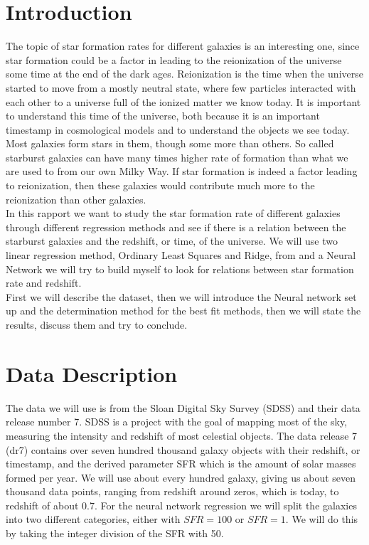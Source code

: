\documentclass[11pt, A4paper, english]{article}
\begin{document}
	
	\begin{multicols}{2}
		\section{Introduction}
The topic of star formation rates for different galaxies is an interesting one, since star formation could be a factor in leading to the reionization of the universe some time at the end of the dark ages. Reionization is the time when the universe started to move from a mostly neutral state, where few particles interacted with each other to a universe full of the ionized matter we know today. It is important to understand this time of the universe, both because it is an important timestamp in cosmological models and to understand the objects we see today. \\
Most galaxies form stars in them, though some more than others. So called starburst galaxies can have many times higher rate of formation than what we are used to from our own Milky Way. If star formation is indeed a factor leading to reionization, then these galaxies would contribute much more to the reionization than other galaxies. \\
In this rapport we want to study the star formation rate of different galaxies through different regression methods and see if there is a relation between the starburst galaxies and the redshift, or time, of the universe. We will use two linear regression method, Ordinary Least Squares and Ridge, from \cite{Project 1} and a Neural Network we will try to build myself to look for relations between star formation rate and redshift. \\
First we will describe the dataset, then we will introduce the Neural network set up and the determination method for the best fit methods, then we will state the results, discuss them and try to conclude.
		
		\section{Data Description}
The data we will use is from the Sloan Digital Sky Survey (SDSS) \cite{SDSS} and their data release number 7. SDSS is a project with the goal of mapping most of the sky, measuring the intensity and redshift of most celestial objects. The data release 7 (dr7) contains over seven hundred thousand galaxy objects with their redshift, or timestamp, and the derived parameter SFR which is the amount of solar masses formed per year. We will use about every hundred galaxy, giving us about seven thousand data points, ranging from redshift around zeros, which is today, to redshift of about 0.7. For the neural network regression we will split the galaxies into two different categories, either with $SFR = 100$ or $SFR = 1$. We will do this by taking the integer division of the SFR with 50.


\end{multicols}
\end{document}

